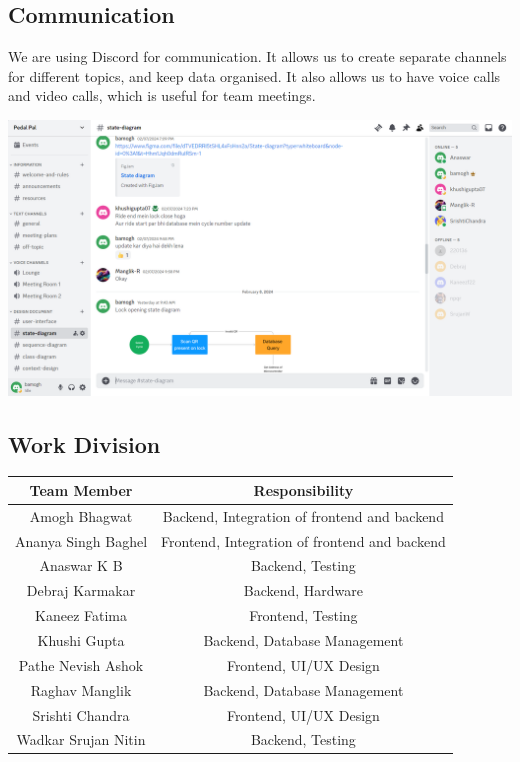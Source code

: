 \documentclass[11pt]{article}
\begin{document}
\subsection{Communication}
We are using Discord for communication. It allows us to create separate channels for different topics, and keep data organised. It also allows us to have voice calls and video calls, which is useful for team meetings.
\begin{center}
  \includegraphics[scale=0.3]{project-plan-images/communication.png}
\end{center}

\subsection{Work Division}
\begin{center}
\begin{tabular}{|c|c|}
  \hline
  \textbf{Team Member} & \textbf{Responsibility} \\
  \hline
  Amogh Bhagwat & Backend, Integration of frontend and backend \\
  \hline
  Ananya Singh Baghel & Frontend, Integration of frontend and backend\\
  \hline
  Anaswar K B & Backend, Testing\\
  \hline
  Debraj Karmakar & Backend, Hardware\\
  \hline
  Kaneez Fatima & Frontend, Testing\\
  \hline
  Khushi Gupta & Backend, Database Management\\
  \hline
  Pathe Nevish Ashok & Frontend, UI/UX Design\\
  \hline
  Raghav Manglik & Backend, Database Management\\
  \hline
  Srishti Chandra & Frontend, UI/UX Design\\
  \hline
  Wadkar Srujan Nitin & Backend, Testing\\
  \hline
\end{tabular}
\end{center}
\end{document}
